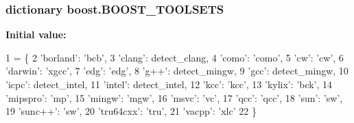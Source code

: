 \subsubsection[{\texorpdfstring{B\+O\+O\+S\+T\+\_\+\+T\+O\+O\+L\+S\+E\+TS}{BOOST_TOOLSETS}}]{\setlength{\rightskip}{0pt plus 5cm}dictionary boost.\+B\+O\+O\+S\+T\+\_\+\+T\+O\+O\+L\+S\+E\+TS}\hypertarget{namespaceboost_a558a385fcd527bf8583ab3c559196f64}{}\label{namespaceboost_a558a385fcd527bf8583ab3c559196f64}
{\bfseries Initial value\+:}
\begin{DoxyCode}
1 = \{
2   \textcolor{stringliteral}{'borland'}:  \textcolor{stringliteral}{'bcb'},
3   \textcolor{stringliteral}{'clang'}:  detect\_clang,
4   \textcolor{stringliteral}{'como'}:  \textcolor{stringliteral}{'como'},
5   \textcolor{stringliteral}{'cw'}:    \textcolor{stringliteral}{'cw'},
6   \textcolor{stringliteral}{'darwin'}:   \textcolor{stringliteral}{'xgcc'},
7   \textcolor{stringliteral}{'edg'}:    \textcolor{stringliteral}{'edg'},
8   \textcolor{stringliteral}{'g++'}:    detect\_mingw,
9   \textcolor{stringliteral}{'gcc'}:    detect\_mingw,
10   \textcolor{stringliteral}{'icpc'}:  detect\_intel,
11   \textcolor{stringliteral}{'intel'}:  detect\_intel,
12   \textcolor{stringliteral}{'kcc'}:    \textcolor{stringliteral}{'kcc'},
13   \textcolor{stringliteral}{'kylix'}:  \textcolor{stringliteral}{'bck'},
14   \textcolor{stringliteral}{'mipspro'}:  \textcolor{stringliteral}{'mp'},
15   \textcolor{stringliteral}{'mingw'}:  \textcolor{stringliteral}{'mgw'},
16   \textcolor{stringliteral}{'msvc'}:  \textcolor{stringliteral}{'vc'},
17   \textcolor{stringliteral}{'qcc'}:    \textcolor{stringliteral}{'qcc'},
18   \textcolor{stringliteral}{'sun'}:    \textcolor{stringliteral}{'sw'},
19   \textcolor{stringliteral}{'sunc++'}:   \textcolor{stringliteral}{'sw'},
20   \textcolor{stringliteral}{'tru64cxx'}: \textcolor{stringliteral}{'tru'},
21   \textcolor{stringliteral}{'vacpp'}:  \textcolor{stringliteral}{'xlc'}
22 \}
\end{DoxyCode}
